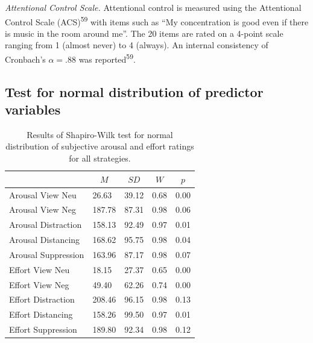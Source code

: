 \documentclass[
  man,floatsintext]{apa6}
\begin{document}
\emph{Attentional Control Scale.} Attentional control is measured using the Attentional Control Scale (ACS)\textsuperscript{59} with items such as ``My concentration is good even if there is music in the room around me''.
The 20 items are rated on a 4-point scale ranging from 1 (almost never) to 4 (always).
An internal consistency of Cronbach's \(\alpha=.88\) was reported\textsuperscript{59}.

\newpage

\hypertarget{SupplementNV}{%
\subsection{Test for normal distribution of predictor variables}\label{SupplementNV}}

\begin{table}[H]

\begin{center}
\begin{threeparttable}

\caption{\label{tab:TabNV}Results of Shapiro-Wilk test for normal distribution of subjective arousal and effort ratings for all strategies.}

\begin{tabular}{lllll}
\toprule
 & \multicolumn{1}{c}{$M$} & \multicolumn{1}{c}{$SD$} & \multicolumn{1}{c}{$W$} & \multicolumn{1}{c}{$p$}\\
\midrule
Arousal View Neu & 26.63 & 39.12 & 0.68 & 0.00\\
Arousal View Neg & 187.78 & 87.31 & 0.98 & 0.06\\
Arousal Distraction & 158.13 & 92.49 & 0.97 & 0.01\\
Arousal Distancing & 168.62 & 95.75 & 0.98 & 0.04\\
Arousal Suppression & 163.96 & 87.17 & 0.98 & 0.07\\
Effort View Neu & 18.15 & 27.37 & 0.65 & 0.00\\
Effort View Neg & 49.40 & 62.26 & 0.74 & 0.00\\
Effort Distraction & 208.46 & 96.15 & 0.98 & 0.13\\
Effort Distancing & 158.26 & 99.50 & 0.97 & 0.01\\
Effort Suppression & 189.80 & 92.34 & 0.98 & 0.12\\
\bottomrule
\end{tabular}

\end{threeparttable}
\end{center}

\end{table}
\end{document}
